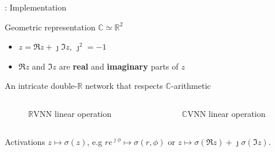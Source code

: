 \documentclass[handout]{beamer}
\newcommand{\real}{\mathbb{R}}
\newcommand{\cplx}{\mathbb{C}}
\newcommand{\iu}{{\jmath}}
\begin{document}
\begin{frame}[c]{\insertsection: Implementation}

  Geometric representation $\cplx \simeq \real^2$
  \begin{itemize}
    \item $z = \Re{z} + \iu \Im{z}$, $\iu^2 = -1$
    \item $\Re{z}$ and $\Im{z}$ are \textbf{real} and \textbf{imaginary} parts of $z$
  \end{itemize}

  \bigskip

  \bigskip
  An intricate double-$\real$ network that respects $\cplx$-arithmetic
  \vspace{-1em}
  \begin{columns}[T]
    \begin{column}{0.45\linewidth}
      \begin{figure}
          
        {$\real$VNN linear operation}
      \end{figure}
    \end{column}%
    \begin{column}{0.45\linewidth}
      \begin{figure}
          
        {$\cplx$VNN linear operation}
      \end{figure}
    \end{column}
  \end{columns}

  \bigskip

  \bigskip
  Activations $z \mapsto \sigma(z)$, e.g $
    r e^{\iu \phi} \mapsto \sigma(r, \phi)
  $ or $
    z \mapsto \sigma(\Re{z}) + \iu \sigma(\Im{z}) %
  $.


\end{frame}
\end{document}
